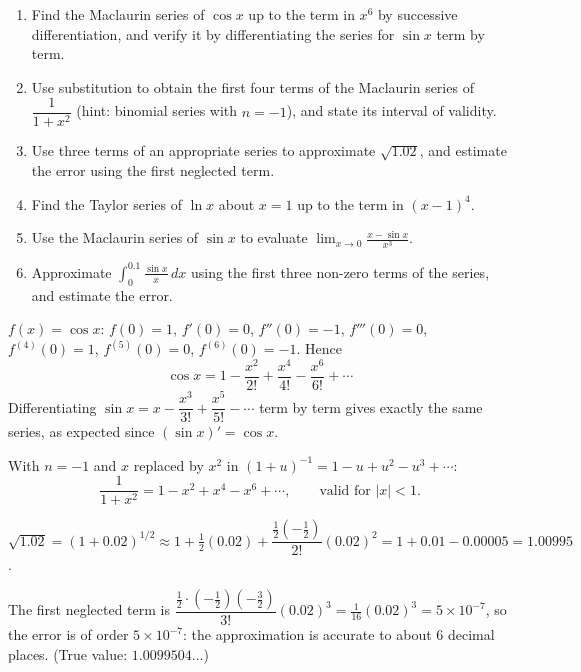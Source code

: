 \documentclass[11pt]{article}
\begin{document}
\begin{exercice}[Practice]
\begin{enumerate}
\item Find the Maclaurin series of $\cos x$ up to the term in $x^6$ by successive differentiation, and verify it by differentiating the series for $\sin x$ term by term.
\item Use substitution to obtain the first four terms of the Maclaurin series of $\dfrac{1}{1+x^2}$ (hint: binomial series with $n = -1$), and state its interval of validity.
\item Use three terms of an appropriate series to approximate $\sqrt{1.02}$, and estimate the error using the first neglected term.
\item Find the Taylor series of $\ln x$ about $x = 1$ up to the term in $(x-1)^4$.
\item Use the Maclaurin series of $\sin x$ to evaluate $\displaystyle\lim_{x\to 0} \frac{x - \sin x}{x^3}$.
\item Approximate $\int_0^{0.1} \frac{\sin x}{x}\,dx$ using the first three non-zero terms of the series, and estimate the error.
\end{enumerate}
\end{exercice}

\begin{corrige}[Exercise 1]
$f(x) = \cos x$: $f(0) = 1$, $f'(0) = 0$, $f''(0) = -1$, $f'''(0) = 0$, $f^{(4)}(0) = 1$, $f^{(5)}(0) = 0$, $f^{(6)}(0) = -1$. Hence
\[ \cos x = 1 - \frac{x^2}{2!} + \frac{x^4}{4!} - \frac{x^6}{6!} + \cdots \]
Differentiating $\sin x = x - \dfrac{x^3}{3!} + \dfrac{x^5}{5!} - \cdots$ term by term gives exactly the same series, as expected since $(\sin x)' = \cos x$.
\end{corrige}

\begin{corrige}[Exercise 2]
With $n = -1$ and $x$ replaced by $x^2$ in $(1+u)^{-1} = 1 - u + u^2 - u^3 + \cdots$:
\[ \frac{1}{1+x^2} = 1 - x^2 + x^4 - x^6 + \cdots, \qquad \text{valid for } |x| < 1. \]
\end{corrige}

\begin{corrige}[Exercise 3]
$\sqrt{1.02} = (1 + 0.02)^{1/2} \approx 1 + \tfrac{1}{2}(0.02) + \dfrac{\tfrac{1}{2}\left(-\tfrac{1}{2}\right)}{2!}(0.02)^2 = 1 + 0.01 - 0.00005 = 1.00995$.

The first neglected term is $\dfrac{\tfrac12\cdot\left(-\tfrac12\right)\left(-\tfrac32\right)}{3!}(0.02)^3 = \tfrac{1}{16}(0.02)^3 = 5\times 10^{-7}$, so the error is of order $5 \times 10^{-7}$: the approximation is accurate to about 6 decimal places. (True value: $1.0099504\ldots$)
\end{corrige}
\end{document}
